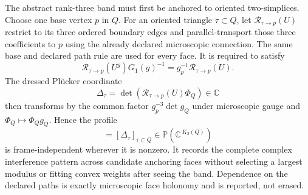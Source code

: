\documentclass[11pt,letterpaper]{article}
\begin{document}
The abstract rank-three band must first be anchored to oriented two-simplices.
Choose one base vertex $p$ in $Q$. For an oriented triangle $\tau\subset Q$,
let $\mathcal R_{\tau\to p}(U)$ restrict to its three ordered boundary edges
and parallel-transport those three coefficients to $p$ using the already
declared microscopic connection. The same base and declared path rule are used
for every face. It is required to satisfy
\begin{equation*}
  \mathcal R_{\tau\to p}(U^g)G_1(g)^{-1}
  =g_p^{-1}\mathcal R_{\tau\to p}(U).
\end{equation*}
The dressed Pl\"ucker coordinate
\begin{equation*}
  \Delta_\tau
  =\det\!\left(\mathcal R_{\tau\to p}(U)\Phi_Q\right)\in\mathbb C
\end{equation*}
then transforms by the common factor $g_p^{-3}\det g_Q$ under microscopic
gauge and $\Phi_Q\mapsto\Phi_Qg_Q$. Hence the profile
\begin{equation*}
  [\Delta_Q]=[\Delta_\tau]_{\tau\subset Q}
  \in\mathbb P\!\left(\mathbb C^{\,K_2(Q)}\right)
\end{equation*}
is frame-independent wherever it is nonzero. It records the complete complex
interference pattern across candidate anchoring faces without selecting a
largest modulus or fitting convex weights after seeing the band. Dependence on
the declared paths is exactly microscopic face holonomy and is reported, not
erased.
\end{document}
